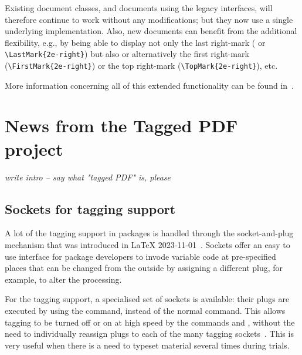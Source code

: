 \documentclass{ltnews}
\begin{document}
Existing
document classes, and documents using the legacy interfaces, will therefore
continue to work without any modifications; but they now use a single underlying
implementation. Also, new documents can benefit from the additional
flexibility, 
e.g., by being able to display not only the last right-mark
( or \verb=\LastMark{2e-right}=) but also  or alternatively the first
right-mark (\verb=\FirstMark{2e-right}=) or the top right-mark
(\verb=\TopMark{2e-right}=), etc.

More information concerning all of this extended functionality can be found in~\cite{41:ltmarks}. 


\section{News from the Tagged PDF project}

\emph{write intro -- say what "tagged PDF" is, please}

\subsection{Sockets for tagging support}

A lot of the tagging support in packages is handled through the socket-and-plug 
mechanism that was introduced in \LaTeX{}
2023-11-01~\cite{41:ltnews38}.
%
Sockets offer an easy to use interface
for package developers to invode variable code at pre-specified places that
can be changed from the outside by assigning a different plug, for example, to alter the processing.


For the tagging support, a specialised set of sockets is available: 
their plugs are executed
by using the   command, instead of the normal
 command. This allows tagging to be turned off or on at high
speed by the commands  and , without the need
to individually reassign plugs to each of the many tagging
sockets~\cite{41:ltnews39}. This is very useful 
when there is a need to typeset material several times during trials. 
\end{document}
